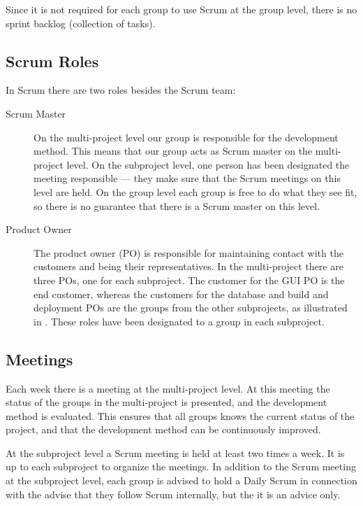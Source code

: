 Since it is not required for each group to use Scrum at the group level, there is no sprint backlog (collection of tasks).

\subsection{Scrum Roles}
In Scrum there are two roles besides the Scrum team:

\begin{description}
  \item[Scrum Master] On the multi-project level our group is responsible for the development method. This means that our group acts as Scrum master on the multi-project level. On the subproject level, one person has been designated the meeting responsible --- they make sure that the Scrum meetings on this level are held. On the group level each group is free to do what they see fit, so there is no guarantee that there is a Scrum master on this level.
  \item[Product Owner] The product owner (PO) is responsible for maintaining contact with the customers and being their representatives. In the multi-project there are three POs, one for each subproject. The customer for the GUI PO is the end customer, whereas the customers for the database and build and deployment POs are the groups from the other subprojects, as illustrated in . These roles have been designated to a group in each subproject.
\end{description}


\subsection{Meetings}
Each week there is a meeting at the multi-project level. At this meeting the status of the groups in the multi-project is presented, and the development method is evaluated. This ensures that all groups knows the current status of the project, and that the development method can be continuously  improved.

At the subproject level a Scrum meeting is held at least two times a week. It is up to each subproject to organize the meetings. In addition to the Scrum meeting at the subproject level, each group is advised to hold a Daily Scrum in connection with the advise that they follow Scrum internally, but the it is an advice only.

